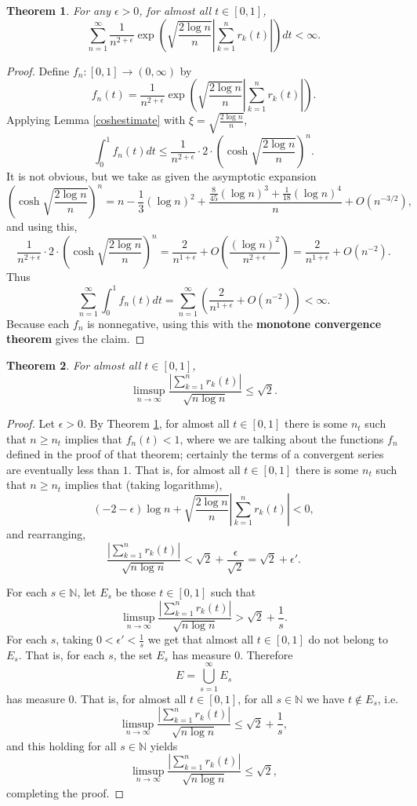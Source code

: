 \documentclass{article}
\newtheorem{theorem}{Theorem}
\theoremstyle{definition}
\begin{document}
\begin{theorem}
For any $\epsilon>0$, for almost all $t \in [0,1]$,
\[
\sum_{n=1}^\infty \frac{1}{n^{2+\epsilon}} \exp\left(\sqrt{\frac{2\log n}{n}} \left| \sum_{k=1}^n r_k(t) \right| \right) dt<\infty.
\]
\label{seriesaa}
\end{theorem}
\begin{proof}
Define $f_n:[0,1] \to (0,\infty)$ by
\[
f_n(t) = \frac{1}{n^{2+\epsilon}} \exp\left( \sqrt{\frac{2\log n}{n}} \left| \sum_{k=1}^n r_k(t) \right| \right).
\]
Applying Lemma \ref{coshestimate} with $\xi =  \sqrt{\frac{2\log n}{n}}$,
\[
\int_0^1 f_n(t) dt \leq \frac{1}{n^{2+\epsilon}} \cdot 2 \cdot \left( \cosh  \sqrt{\frac{2\log n}{n}} \right)^n.
\]
It is not obvious, but we take as given the asymptotic expansion
\[
 \left( \cosh  \sqrt{\frac{2\log n}{n}} \right)^n = n-\frac{1}{3} (\log n)^2 +
 \frac{\frac{8}{45} (\log n)^3+\frac{1}{18} (\log n)^4}{n} + O(n^{-3/2}),
\]
and using this,
\[
\frac{1}{n^{2+\epsilon}} \cdot 2 \cdot \left( \cosh  \sqrt{\frac{2\log n}{n}} \right)^n = 
\frac{2}{n^{1+\epsilon}}+O\left( \frac{(\log n)^2}{n^{2+\epsilon}}\right)
=\frac{2}{n^{1+\epsilon}}+O(n^{-2}).
\]
Thus 
\[
\sum_{n=1}^\infty \int_0^1 f_n(t) dt  = \sum_{n=1}^\infty\left( \frac{2}{n^{1+\epsilon}}+O(n^{-2}) \right)
<\infty.
\]
Because each $f_n$ is nonnegative, using this with the \textbf{monotone convergence theorem} gives the claim.
\end{proof}


\begin{theorem}
For almost all $t \in [0,1]$,
\[
\limsup_{n \to \infty} \frac{\left| \sum_{k=1}^n r_k(t) \right|}{\sqrt{n \log n}} \leq \sqrt{2}.
\]
\end{theorem}
\begin{proof}
Let $\epsilon>0$.
By Theorem \ref{seriesaa}, for almost all $t \in [0,1]$ there is some $n_t$ such that $n \geq n_t$ implies that $f_n(t)<1$, where we are talking about the functions
$f_n$ defined in the proof of that theorem; certainly the terms of a convergent series are eventually less than $1$. 
That is, for almost all $t \in [0,1]$ there is some $n_t$ such that $n \geq n_t$ implies that (taking logarithms),
\[
(-2-\epsilon) \log n +  \sqrt{\frac{2\log n}{n}} \left| \sum_{k=1}^n r_k(t) \right|<0,
\]
and rearranging,
\[
\frac{\left| \sum_{k=1}^n r_k(t) \right|}{\sqrt{n \log n}} < \sqrt{2}+\frac{\epsilon}{\sqrt{2}}=\sqrt{2}+\epsilon'.
\]

For each $s \in \mathbb{N}$, let $E_s$ be those $t \in [0,1]$ such that
\[
\limsup_{n \to \infty} \frac{\left| \sum_{k=1}^n r_k(t) \right|}{\sqrt{n \log n}} > \sqrt{2}+\frac{1}{s}.
\]
For each $s$, taking $0<\epsilon'<\frac{1}{s}$ we get that almost all $t \in [0,1]$ do not belong to $E_s$. That is, for each
$s$, the set $E_s$ has measure $0$. Therefore
\[
E = \bigcup_{s=1}^\infty E_s
\]
has measure $0$. 
That is, for almost all $t \in [0,1]$, for all  $s \in \mathbb{N}$ we have
$t \not \in E_s$, i.e.
\[
\limsup_{n \to \infty} \frac{\left| \sum_{k=1}^n r_k(t) \right|}{\sqrt{n \log n}} \leq \sqrt{2}+\frac{1}{s},
\]
and this holding for all $s \in \mathbb{N}$ yields
\[
\limsup_{n \to \infty} \frac{\left| \sum_{k=1}^n r_k(t) \right|}{\sqrt{n \log n}} \leq \sqrt{2},
\]
completing the proof.
\end{proof}
\end{document}
